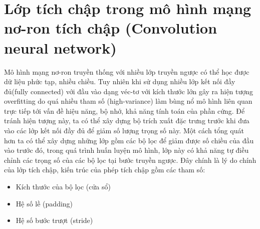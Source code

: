 \section{Lớp tích chập trong mô hình mạng nơ-ron tích chập (Convolution neural network)} 
Mô hình mạng nơ-ron truyền thống với nhiều lớp truyền ngược có thể học được dữ liệu phức tạp, nhiều chiều. Tuy nhiên khi sử dụng nhiều lớp kết nối đầy đủ(fully connected) với đầu vào dạng véc-tơ với kích thước lớn gây ra hiện tượng overfitting do quá nhiều tham số (high-variance) làm bùng nổ mô hình liên quan trực tiếp tới vấn đề hiệu năng, bộ nhớ, khả năng tính toán của phần cứng. Để tránh hiện tượng này, ta có thể xây dựng bộ trích xuất đặc trưng trước khi đưa vào các lớp kết nối đầy đủ để giảm số lượng trọng số này. Một cách tổng quát hơn ta có thể xây dựng những lớp gồm các bộ lọc để giảm được số chiều của đầu vào trước đó, trong quá trình huấn luyện mô hình, lớp này có khả năng tự điều chỉnh các trọng số của các bộ lọc tại bước truyền ngược. Đây chính là lý do chính của lớp tích chập, kiến trúc của phép tích chập gồm các tham số:
\begin{itemize}
\item Kích thước của bộ lọc (cửa sổ)
\item Hệ số lề (padding)
\item Hệ số bước trượt (stride)
\end{itemize}
 
